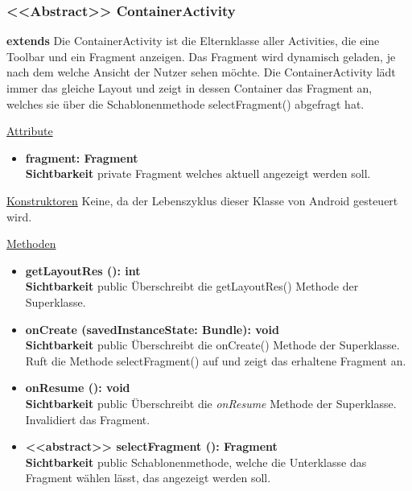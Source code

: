 \subsubsection{<<Abstract>> ContainerActivity} \label{app:klasse:ContainerActivity}
\textbf{extends}  \newline
Die ContainerActivity ist die Elternklasse aller Activities, die eine Toolbar und ein Fragment anzeigen. Das Fragment wird dynamisch geladen, je nach dem welche Ansicht der Nutzer sehen möchte. 
Die ContainerActivity lädt immer das gleiche Layout und zeigt in dessen Container das Fragment an, welches sie über die Schablonenmethode selectFragment() abgefragt hat.
\newline

\underline{Attribute}
\begin{itemize}
\itemsep0pt
\item \textbf{fragment: Fragment} \hfill\\ 
\textbf{Sichtbarkeit} private\newline
Fragment welches aktuell angezeigt werden soll.

\end{itemize}

\underline{Konstruktoren}\newline
\indent Keine, da der Lebenszyklus dieser Klasse von Android gesteuert wird.\newline

\underline{Methoden}
\begin{itemize}
\itemsep0pt

\item \textbf{getLayoutRes (): int}\hfill\\
\textbf{Sichtbarkeit} public\newline
Überschreibt die getLayoutRes() Methode der Superklasse.

\item \textbf{onCreate (savedInstanceState: Bundle): void}\hfill\\
\textbf{Sichtbarkeit} public\newline
Überschreibt die onCreate() Methode der Superklasse. Ruft die Methode selectFragment() auf und zeigt das erhaltene Fragment an.

\item \textbf{onResume (): void}\hfill\\
\textbf{Sichtbarkeit} public\newline
Überschreibt die \textit{onResume} Methode der Superklasse. Invalidiert das Fragment.

\item \textbf{<<abstract>> selectFragment (): Fragment} \hfill\\
\textbf{Sichtbarkeit} public\newline
Schablonenmethode, welche die Unterklasse das Fragment wählen lässt, das angezeigt werden soll.

\end{itemize}